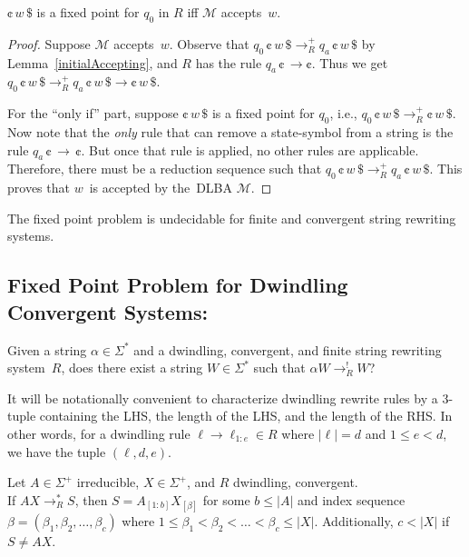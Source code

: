 \documentclass{lmcs} %
\theoremstyle{plain}\newtheorem{satz}[thm]{Satz} %
\begin{document}
\begin{lem}
$\cent \,w\, \$$ is a fixed point for $q_0$ in $R$ iff
$\mathcal{M}$ accepts~$w$.
\end{lem}
\begin{proof}
Suppose $\mathcal{M}$ accepts~$w$.
Observe that $q_0\, \cent \, w \, \$ \rightarrow_R^{+} q_a\, \cent \,
w\, \$ $ by Lemma~\ref{initialAccepting}, and $R$ has the rule
$q_a \, \cent \, \rightarrow \cent$. Thus we get
$q_0\, \cent \, w \, \$ \rightarrow_R^{+} q_a\, \cent \, w\, \$
\rightarrow \cent \, w \,\$ $.

For the ``only if'' part, suppose $\cent \,w\, \$$ is a fixed point
for $q_0$, i.e., $q_0\, \cent \, w \, \$ \rightarrow_R^{+} \cent \, w
\,\$ $. Now note that the \emph{only} rule that can remove a
state-symbol from a string is the rule $q_a \, \cent \, \rightarrow \,
\cent$. But once that rule is applied, no other rules are
applicable. Therefore, there must be a reduction sequence such that $q_0\,
\cent \, w \, \$ \rightarrow_R^{+} q_a\, \cent \, w\, \$$. This
proves that $w$~is accepted by the~DLBA $\mathcal{M}$. 
\end{proof}

\begin{thm}\label{FPConvergent}
The fixed point problem is undecidable for finite and convergent
string rewriting systems.
\end{thm}

\subsection{Fixed Point Problem for Dwindling Convergent Systems:}

Given a string $\alpha \in \Sigma^*$ and a dwindling, convergent, and
finite string rewriting system~$R$, does there exist a string $W\in
\Sigma^*$ such that $\alpha W \rightarrow^!_R W$?



It will be notationally convenient to characterize dwindling rewrite
rules by a 3-tuple containing the LHS, the length of the LHS, and the length of the RHS.
In other words, for a dwindling rule $\ell \rightarrow \ell_{1:e} \in R$
where $|\ell| = d$ and $1 \leq e < d$, we have the tuple $(\ell,d,e)$.

\begin{lem}\label{dwindling_fp_l1} %
Let $A\in\Sigma^+$ irreducible, $X\in\Sigma^+$, and $R$ dwindling,
convergent. \\If $AX\rightarrow_R^* S$, then 
 $S=A_{[1:b]}X_{[\beta]}$ for some $b\leq|A|$ and index sequence \\$\beta
 = (\beta_1,\beta_2,\dots , \beta_c)$ where $1\leq \beta_1 < \beta_2 < \dots < \beta_c \leq |X|$. Additionally, $c < |X|$ if $S \neq AX$.
\end{lem}
\end{document}

